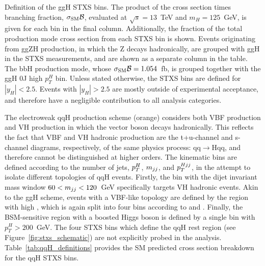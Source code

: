 \begin{table}[htb!]
    \caption[ggH STXS bin definitions]{Definition of the ggH STXS bins. The product of the cross section times \Hgg branching fraction, $\sigma_{\rm{SM}}\mathcal{B}$, evaluated at $\sqrt{s}=13$~TeV and $m_H=125$~GeV, is given for each bin in the final column. Additionally, the fraction of the total production mode cross section from each STXS bin is shown. Events originating from ggZH production, in which the Z decays hadronically, are grouped with ggH in the STXS measurements, and are shown as a separate column in the table. The bbH production mode, whose $\sigma_{\rm{SM}}\mathcal{B}=1.054$~fb, is grouped together with the ggH 0J high $p_T^H$ bin. Unless stated otherwise, the STXS bins are defined for $|y_H|<2.5$. Events with $|y_H|>2.5$ are mostly outside of experimental acceptance, and therefore have a negligible contribution to all analysis categories.}
    \label{tab:ggH_definitions}
    \centering
    \scriptsize
    \renewcommand{\arraystretch}{1.2}
    \setlength{\tabcolsep}{3pt}
    \hspace*{-3cm}
    
    \hspace*{-3cm}
\end{table}

The electroweak qqH production scheme (orange) considers both VBF production and VH production in which the vector boson decays hadronically. This reflects the fact that VBF and VH hadronic production are the t+u-channel and s-channel diagrams, respectively, of the same physics process: qq$\rightarrow$Hqq, and therefore cannot be distinguished at higher orders. The kinematic bins are defined according to the number of jets, $p_T^H$, $m_{jj}$, and $p_T^{Hjj}$, in the attempt to isolate different topologies of qqH events. Firstly, the bin with the dijet invariant mass window $60<m_{jj}<120$~GeV specifically targets VH hadronic events. Akin to the ggH scheme, events with a VBF-like topology are defined by the region with high \mjj, which is again split into four bins according to \mjj and \ptHjj. Finally, the BSM-sensitive region with a boosted Higgs boson is defined by a single bin with $p_T^H>200$~GeV. The four STXS bins which define the qqH rest region (see Figure~\ref{fig:stxs_schematic}) are not explicitly probed in the \Hgg analysis. Table~\ref{tab:qqH_definitions} provides the SM predicted cross section breakdown for the qqH STXS bins.

